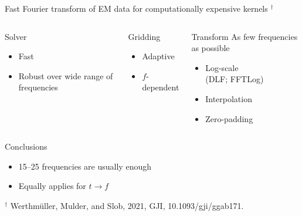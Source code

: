 \documentclass[xcolor=svgnames, usepdftitle=false, aspectratio=169]{beamer}
\begin{document}
\begin{frame}
  {Fast Fourier transform of EM data for computationally expensive kernels
  $^\dagger$}

  \begin{columns}[t]

    \begin{block}
      {Solver}
      \begin{itemize}
        \item Fast
        \item Robust over wide range of frequencies
      \end{itemize}
    \end{block}


    \begin{block}
      {Gridding}

      \begin{itemize}
        \item Adaptive
        \item $f$-dependent
      \end{itemize}
    \end{block}


    \begin{block}
      {Transform}
      As few frequencies as possible
      \begin{itemize}
        \item Log-scale\\(DLF; FFTLog)
        \item Interpolation
        \item Zero-padding
      \end{itemize}
    \end{block}

  \end{columns}

  \vspace{-1cm}
  \alert{Conclusions}
  \begin{itemize}
    \item 15--25 frequencies are usually enough
    \item Equally applies for $t\rightarrow f$
  \end{itemize}

  \vspace{.5cm}
  \footnotesize
  $^\dagger$ Werthmüller, Mulder, and Slob, 2021, GJI, 10.1093/gji/ggab171.

\end{frame}
\end{document}

